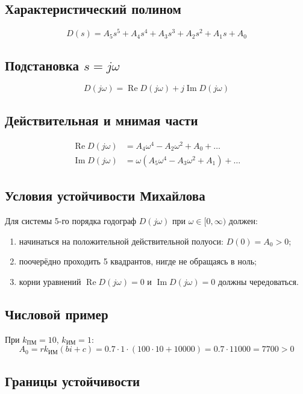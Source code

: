 \documentclass[14pt]{extreport}
\begin{document}
{\subsection*{Характеристический полином}
\[
D(s) = A_5 s^5 + A_4 s^4 + A_3 s^3 + A_2 s^2 + A_1 s + A_0
\]

\subsection*{Подстановка \( s = j\omega \)}
\[
D(j\omega) = \operatorname{Re} D(j\omega) + j \operatorname{Im} D(j\omega)
\]

\subsection*{Действительная и мнимая части}
\[
\begin{aligned}
\operatorname{Re} D(j\omega) &= A_4 \omega^4 - A_2 \omega^2 + A_0 + \dots \\
\operatorname{Im} D(j\omega) &= \omega (A_5 \omega^4 - A_3 \omega^2 + A_1) + \dots
\end{aligned}
\]

\subsection*{Условия устойчивости Михайлова}

Для системы 5-го порядка годограф $D(j\omega)$ при $\omega \in [0, \infty)$ должен:
\begin{enumerate}
    \item начинаться на положительной действительной полуоси: $D(0) = A_0 > 0$;
    \item поочерёдно проходить 5 квадрантов, нигде не обращаясь в ноль;
    \item корни уравнений $\operatorname{Re} D(j\omega)=0$ и $\operatorname{Im} D(j\omega)=0$ должны чередоваться.
\end{enumerate}

\subsection*{Числовой пример}

При $k_{\text{ПМ}} = 10$, $k_{\text{ИМ}} = 1$:
\[
A_0 = r k_{\text{ИМ}} (b i + c) = 0.7 \cdot 1 \cdot (100 \cdot 10 + 10000) = 0.7 \cdot 11000 = 7700 > 0
\]

\subsection*{Границы устойчивости}

}
\end{document}
